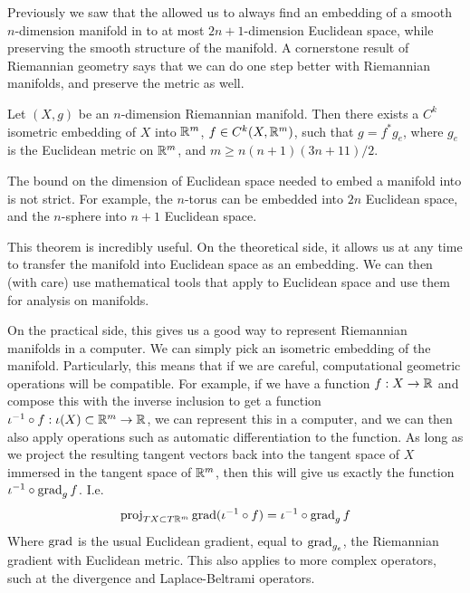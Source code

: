 Previously we saw that the  allowed us to always find an embedding of a smooth \(n\)-dimension manifold in to at most \(2n+1\)-dimension Euclidean space, while preserving the smooth structure of the manifold.
A cornerstone result of Riemannian geometry says that we can do one step better with Riemannian manifolds, and preserve the metric as well.
\begin{theorem}
	\label{thm:nash_embedding}
	Let \((X, g)\) be an \(n\)-dimension Riemannian manifold.
	Then there exists a \(C^k\) isometric embedding of \(X\) into \(\mathbb{R}^m\), \(f \in C^k(X, \mathbb{R}^m)\), such that \(g = f^*g_e\), where \(g_e\) is the Euclidean metric on \(\mathbb{R}^m\), and \(m \geq n(n+1)(3n+11)/2\).
\end{theorem}
The bound on the dimension of Euclidean space needed to embed a manifold into is not strict.
For example, the \(n\)-torus can be embedded into \(2n\) Euclidean space, and the \(n\)-sphere into \(n+1\) Euclidean space.

This theorem is incredibly useful.
On the theoretical side, it allows us at any time to transfer the manifold into Euclidean space as an embedding.
We can then (with care) use mathematical tools that apply to Euclidean space and use them for analysis on manifolds.

On the practical side, this gives us a good way to represent Riemannian manifolds in a computer.
We can simply pick an isometric embedding of the manifold.
Particularly, this means that if we are careful, computational geometric operations will be compatible.
For example, if we have a function \(f: X\to \mathbb{R}\) and compose this with the inverse inclusion to get a function \( \iota^{-1}\circ f: \iota(X)\subset\mathbb{R}^m \to \mathbb{R}\), we can represent this in a computer, and we can then also apply operations such as automatic differentiation to the function.
As long as we project the resulting tangent vectors back into the tangent space of \(X\) immersed in the tangent space of \(\mathbb{R}^m\), then this will give us exactly the function \(\iota^{-1} \circ \operatorname{grad}_g f\).
I.e.
\[
	\operatorname{proj}_{TX\subset T\mathbb{R}^m} \operatorname{grad} (\iota^{-1} \circ f) = \iota^{-1} \circ \operatorname{grad}_g f
\]
Where \(\operatorname{grad}\) is the usual Euclidean gradient, equal to \(\operatorname{grad}_{g_e}\), the Riemannian gradient with Euclidean metric.
This also applies to more complex operators, such at the divergence and Laplace-Beltrami operators.

